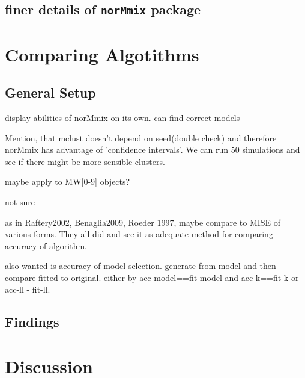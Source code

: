 \section{finer details of {\tt norMmix} package}




\chapter{Comparing Algotithms}

\section{General Setup}
display abilities of norMmix on its own. can find correct models

Mention, that mclust doesn't depend on seed(double check) and therefore norMmix has 
advantage of 'confidence intervals'. We can run 50 simulations and see if there
might be more sensible clusters.

maybe apply to MW[0-9] objects?

not sure

as in Raftery2002, Benaglia2009, Roeder 1997, maybe compare to MISE of various 
forms. They all did and see it as adequate method for comparing accuracy of 
algorithm.

also wanted is accuracy of model selection. generate from model and then compare
fitted to original. either by acc-model==fit-model and acc-k==fit-k or acc-ll - fit-ll.

\section{Findings}



\chapter{Discussion}

